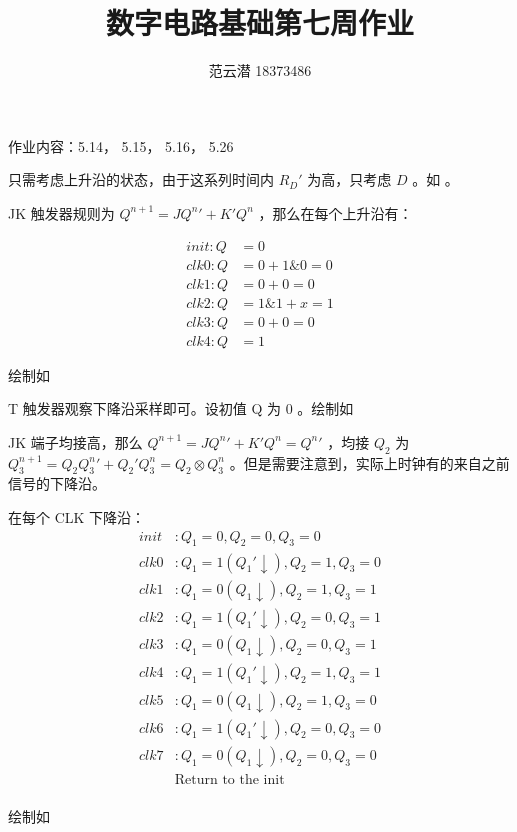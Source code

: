 \documentclass[lang=cn,11pt,a4paper,cite=authoryear, twocolumn]{elegantpaper}
\title{数字电路基础\quad 第七周作业}
\author{范云潜 18373486}
\institute{微电子学院 184111 班}
\date{\zhtoday}
\begin{document}
\maketitle

作业内容：5.14， 5.15， 5.16， 5.26


只需考虑上升沿的状态，由于这系列时间内 \(R_D'\) 为高，只考虑 \(D\) 。如  。




JK 触发器规则为 \(Q^{n+1} = J Q^n {'} + K'Q^n\) ，那么在每个上升沿有：

\[\begin{aligned}
    init: Q &= 0\\
    clk0: Q &= 0 + 1 \& 0 = 0 \\
    clk1: Q &= 0 + 0 = 0 \\
    clk2: Q &= 1 \&  1 + x = 1 \\
    clk3: Q &= 0 + 0 = 0\\
    clk4: Q &= 1 
\end{aligned}\]

绘制如 



T 触发器观察下降沿采样即可。设初值 Q 为 0 。绘制如 



JK 端子均接高，那么 \(Q^{n+1} = J Q^n {'} + K'Q^n = Q^n {'}\) ，均接 \(Q_2\) 为 \(Q_3^{n+1} = Q_2 Q_3^n {'} + Q_2'Q_3^n = Q_2 \otimes Q_3^n\) 。但是需要注意到，实际上时钟有的来自之前信号的下降沿。

在每个 CLK 下降沿： 
\[\begin{aligned}
    init&: Q_1 = 0, Q_2 = 0, Q_3 = 0 \\
    clk0&: Q_1 = 1(Q_1' \downarrow), Q_2 = 1, Q_3 = 0 \\ 
    clk1&: Q_1 = 0(Q_1 \downarrow), Q_2 = 1, Q_3 = 1 \\ 
    clk2&: Q_1 = 1(Q_1' \downarrow), Q_2 = 0, Q_3 = 1 \\ 
    clk3&: Q_1 = 0(Q_1 \downarrow), Q_2 = 0, Q_3 = 1 \\ 
    clk4&: Q_1 = 1(Q_1' \downarrow), Q_2 = 1, Q_3 = 1 \\ 
    clk5&: Q_1 = 0(Q_1 \downarrow), Q_2 = 1, Q_3 = 0 \\ 
    clk6&: Q_1 = 1(Q_1' \downarrow), Q_2 = 0, Q_3 = 0 \\ 
    clk7&: Q_1 = 0(Q_1 \downarrow), Q_2 = 0, Q_3 = 0 \\
    &\text{Return to the init}\\
\end{aligned}\]

绘制如 


\end{document}
